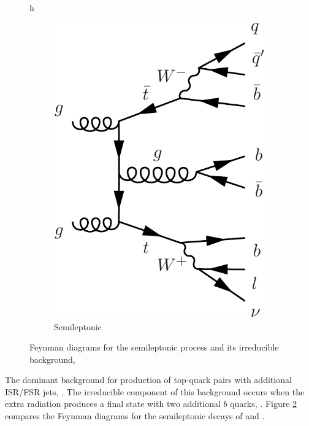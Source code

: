 \begin{figure}{h}
\begin{subfigure}[h]{0.4\textwidth}
        \includegraphics[width=\textwidth]{Figures/Feynman_Diagrams/backgrounds__ttbar_plus_bbar_semileptonic.pdf}
        \caption{Semileptonic \ttbb}\label{fig:higgs_production_vbf}
      \end{subfigure}
      \caption{Feynman diagrams for the semileptonic \ttH process and
        its irreducible background, \ttbb } \label{fig:feynman_diagrams__tth_vs_ttbb_semilep}
\end{figure}

\par The dominant background for \ttH production of top-quark pairs
with additional ISR/FSR jets, \ttjets.  The irreducible component of
this background occurs when the extra radiation produces a final
state with two additional $b$ quarks, \ttbb.  Figure
\ref{fig:feynman_diagrams__tth_vs_ttbb_semilep} compares the Feynman
diagrams for the semileptonic decays of \ttH and \ttbb.  

